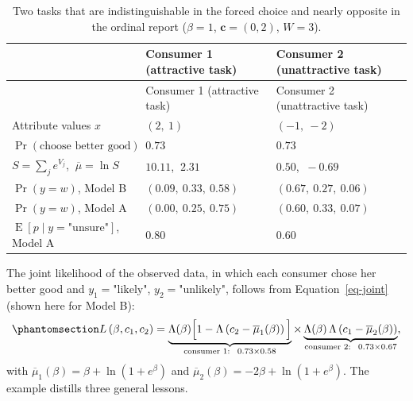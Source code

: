 \documentclass[
  letterpaper,
  DIV=11,
  numbers=noendperiod]{scrartcl}
\theoremstyle{plain}
\theoremstyle{plain}
\theoremstyle{remark}
\begin{document}
\begin{longtable}[]{@{}
  >{\raggedright\arraybackslash}p{}
  >{\centering\arraybackslash}p{}
  >{\centering\arraybackslash}p{}@{}}
\caption{Two tasks that are indistinguishable in the forced choice and
nearly opposite in the ordinal report (\(\beta = 1\),
\(\mathbf{c} = (0,2)\), \(W = 3\)).}\label{tbl-toy}\tabularnewline
\toprule\noalign{}
\begin{minipage}[b]{\linewidth}\raggedright
\end{minipage} & \begin{minipage}[b]{\linewidth}\centering
Consumer 1 (attractive task)
\end{minipage} & \begin{minipage}[b]{\linewidth}\centering
Consumer 2 (unattractive task)
\end{minipage} \\
\midrule\noalign{}
\endfirsthead
\toprule\noalign{}
\begin{minipage}[b]{\linewidth}\raggedright
\end{minipage} & \begin{minipage}[b]{\linewidth}\centering
Consumer 1 (attractive task)
\end{minipage} & \begin{minipage}[b]{\linewidth}\centering
Consumer 2 (unattractive task)
\end{minipage} \\
\midrule\noalign{}
\endhead
\bottomrule\noalign{}
\endlastfoot
Attribute values \(x\) & \((2,\ 1)\) & \((-1,\ -2)\) \\
\(\Pr(\text{choose better good})\) & \(0.73\) & \(0.73\) \\
\(S = \sum_j e^{V_j}\), \(\ \overline{\mu} = \ln S\) & \(10.11\),
\(\ 2.31\) & \(0.50\), \(\ -0.69\) \\
\(\Pr(y = w)\), Model B & \((0.09,\ 0.33,\ 0.58)\) &
\((0.67,\ 0.27,\ 0.06)\) \\
\(\Pr(y = w)\), Model A & \((0.00,\ 0.25,\ 0.75)\) &
\((0.60,\ 0.33,\ 0.07)\) \\
\(\operatorname{E} \left[ p \mid y = \text{"unsure"} \right]\), Model A
& \(0.80\) & \(0.60\) \\
\end{longtable}

The joint likelihood of the observed data, in which each consumer chose
her better good and \(y_1 = \text{"likely"}\),
\(y_2 = \text{"unlikely"}\), follows from Equation~\ref{eq-joint} (shown
here for Model B):
\begin{equation}\protect\phantomsection\label{eq-toylik}{
L \left( \beta, c_1, c_2 \right)
= \underbrace{\Lambda(\beta) \Big[ 1 - \Lambda \left( c_2 - \overline{\mu}_1(\beta) \right) \Big]}_{\text{consumer 1:} \ \ 0.73 \times 0.58}
\times
\underbrace{\Lambda(\beta) \, \Lambda \left( c_1 - \overline{\mu}_2(\beta) \right)}_{\text{consumer 2:} \ \ 0.73 \times 0.67},
}\end{equation} with
\(\overline{\mu}_1(\beta) = \beta + \ln \left( 1 + e^{\beta} \right)\)
and
\(\overline{\mu}_2(\beta) = -2\beta + \ln \left( 1 + e^{\beta} \right)\).
The example distills three general lessons.
\end{document}
